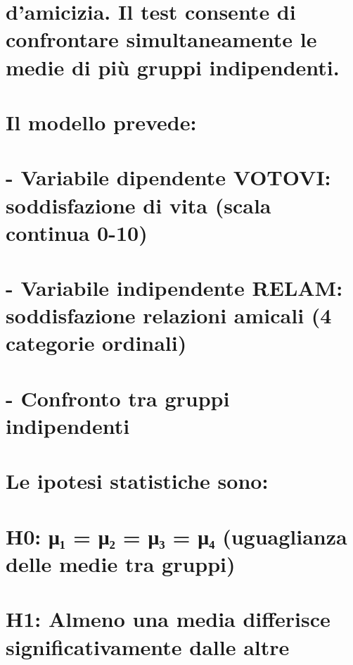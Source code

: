\documentclass[
]{article}
\begin{document}
\section{d'amicizia. Il test consente di confrontare simultaneamente le
medie di più gruppi
indipendenti.}\label{damicizia.-il-test-consente-di-confrontare-simultaneamente-le-medie-di-piuxf9-gruppi-indipendenti.}

\section{Il modello prevede:}\label{il-modello-prevede}

\section{- Variabile dipendente VOTOVI: soddisfazione di vita (scala
continua
0-10)}\label{variabile-dipendente-votovi-soddisfazione-di-vita-scala-continua-0-10}

\section{- Variabile indipendente RELAM: soddisfazione relazioni amicali
(4 categorie
ordinali)}\label{variabile-indipendente-relam-soddisfazione-relazioni-amicali-4-categorie-ordinali}

\section{- Confronto tra gruppi
indipendenti}\label{confronto-tra-gruppi-indipendenti}

\section{Le ipotesi statistiche
sono:}\label{le-ipotesi-statistiche-sono}

\section{H0: μ₁ = μ₂ = μ₃ = μ₄ (uguaglianza delle medie tra
gruppi)}\label{h0-ux3bcux2081-ux3bcux2082-ux3bcux2083-ux3bcux2084-uguaglianza-delle-medie-tra-gruppi}

\section{H1: Almeno una media differisce significativamente dalle
altre}\label{h1-almeno-una-media-differisce-significativamente-dalle-altre}
\end{document}
